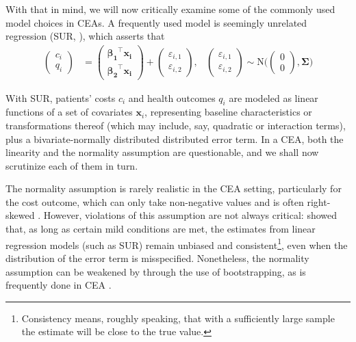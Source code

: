 \documentclass[aoas,preprint]{imsart}
\theoremstyle{plain}
\theoremstyle{definition}
\theoremstyle{remark}
\theoremstyle{remark}
\begin{document}
With that in mind, we will now critically examine some of the commonly used model choices in CEAs. A frequently used model is seemingly unrelated regression (SUR, \citet{zellner1962efficient, ben2023conducting}), which asserts that 
\begin{align}
\begin{pmatrix}  c_i \\ q_i \end{pmatrix} &= 
\begin{pmatrix}  \boldsymbol{\beta_1}^\top \mathbf{x_i}  \\ \boldsymbol{\beta_2}^\top \mathbf{x_i} \end{pmatrix} +
\begin{pmatrix}  \varepsilon_{i,1} \\ \varepsilon_{i,2} \end{pmatrix}, 
& \begin{pmatrix}  \varepsilon_{i,1} \\ \varepsilon_{i,2} \end{pmatrix} \sim \text{N}\Biggl(\begin{pmatrix}  0 \\ 0 \end{pmatrix}, \boldsymbol{\Sigma} \Biggl)
\label{eq:basic_SUR}
\end{align}

With SUR, patients’ costs $c_i$ and health outcomes $q_i$ are modeled as linear functions of a set of covariates $\mathbf{x}_i$, representing baseline characteristics or transformations thereof (which may include, say, quadratic or interaction terms), plus a bivariate-normally distributed distributed error term. In a CEA, both the linearity and the normality assumption are questionable, and we shall now scrutinize each of them in turn.

The normality assumption is rarely realistic in the CEA setting, particularly for the cost outcome, which can only take non-negative values and is often right-skewed \citep{el2022scoping}. However, violations of this assumption are not always critical: \citet{white1980heteroskedasticity} showed that, as long as certain mild conditions are met, the estimates from linear regression models (such as SUR) remain unbiased and consistent\footnote{Consistency means, roughly speaking, that with a sufficiently large sample the estimate will be close to the true value.}, even when the distribution of the error term is misspecified. Nonetheless, the normality assumption can be weakened by through the use of bootstrapping, as is frequently done in CEA \citep{lothgren2000definition}.
\end{document}
